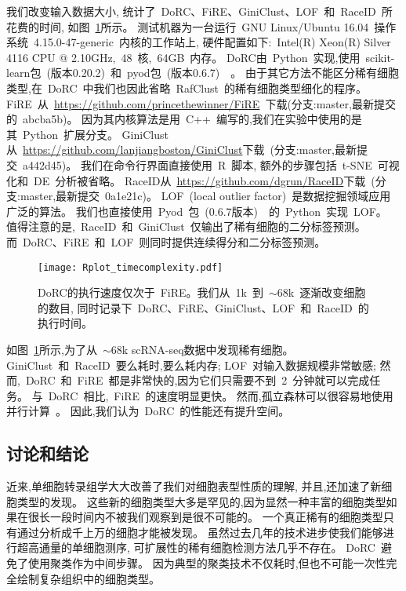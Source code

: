 我们改变输入数据大小,
统计了~DoRC、FiRE、GiniClust、LOF~\cite{breunig2000lof}和~RaceID~所花费的时间,
如图~\ref{fig:timecomplexity}所示。
测试机器为一台运行~GNU Linux/Ubuntu 16.04~操作系统~4.15.0-47-generic~内核的工作站上,
硬件配置如下:~Intel(R) Xeon(R) Silver 4116 CPU @ 2.10GHz,~48~核,~64GB~内存。
DoRC由~Python~实现,使用~scikit-learn包~(版本0.20.2)~\cite{pedregosa2011scikit}和~pyod包~(版本0.6.7)~~\cite{zhao2019pyod}。
由于其它方法不能区分稀有细胞类型,在~DoRC~中我们也因此省略~RafClust~的稀有细胞类型细化的程序。
FiRE~从~\url{https://github.com/princethewinner/FiRE}~下载(分支:master,最新提交的~abcba5b)。
因为其内核算法是用~C++~编写的,我们在实验中使用的是其~Python~扩展分支。
GiniClust从~\url{https://github.com/lanjiangboston/GiniClust}下载~(分支:master,最新提交~a442d45)。
我们在命令行界面直接使用~R~脚本,
额外的步骤包括~t-SNE~可视化和~DE~分析被省略。
RaceID从~\url{https://github.com/dgrun/RaceID}下载~(分支:master,最新提交~0a1e21c)。
LOF~(local outlier factor)~是数据挖掘领域应用广泛的算法。
我们也直接使用~Pyod~包~(0.6.7版本)~\cite{zhao2019pyod}~的~Python~实现~LOF。
值得注意的是,~RaceID~和~GiniClust~仅输出了稀有细胞的二分标签预测。
而~DoRC、FiRE~和~LOF~则同时提供连续得分和二分标签预测。
\begin{figure}[!htbp]
    \centering
    \texttt{[image: Rplot\_timecomplexity.pdf]}
    \caption{
    DoRC的执行速度仅次于~FiRE。我们从~1k~到~${\sim} 68$k~逐渐改变细胞的数目, 同时记录下~DoRC、FiRE、GiniClust、LOF~和~RaceID~的执行时间。    
    }
    \label{fig:timecomplexity}
\end{figure}

如图~\ref{fig:timecomplexity}所示,为了从~${\sim}68$k scRNA-seq数据中发现稀有细胞。 
GiniClust~和~RaceID~要么耗时,要么耗内存;
LOF~对输入数据规模非常敏感;
然而,~DoRC~和~FiRE~都是非常快的,因为它们只需要不到~2~分钟就可以完成任务。
与~DoRC~相比,~FiRE~的速度明显更快。
然而,孤立森林可以很容易地使用并行计算~\cite{hariri2018batch}。
因此,我们认为~DoRC~的性能还有提升空间。

\subsection{讨论和结论}
近来,单细胞转录组学大大改善了我们对细胞表型性质的理解,
并且,还加速了新细胞类型的发现。
这些新的细胞类型大多是罕见的,因为显然一种丰富的细胞类型如果在很长一段时间内不被我们观察到是很不可能的。
一个真正稀有的细胞类型只有通过分析成千上万的细胞才能被发现。
虽然过去几年的技术进步使我们能够进行超高通量的单细胞测序,
可扩展性的稀有细胞检测方法几乎不存在。
DoRC~避免了使用聚类作为中间步骤。
因为典型的聚类技术不仅耗时,但也不可能一次性完全绘制复杂组织中的细胞类型。

